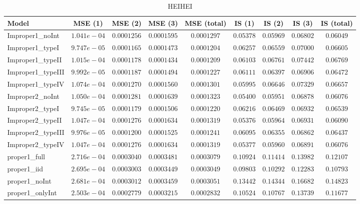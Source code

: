 \begin{table}

\caption{\label{tab:model-choice-sc3}HEIHEI}
\centering
\begin{tabular}{lcccccccc}
\hline
Model  & MSE (1) & MSE (2) & MSE (3) & MSE (total) & IS (1) & IS (2) & IS (3) & \multicolumn{1}{c}{IS (total)} \\ 
\hline
Improper1_noInt  & $1.041e-04$ & $0.0001256$ & $0.0001595$ & $0.0001297$ & $0.05378$ & $0.05969$ & $0.06802$ & $0.06049$ \\
Improper1_typeI  & $9.747e-05$ & $0.0001165$ & $0.0001473$ & $0.0001204$ & $0.06257$ & $0.06559$ & $0.07000$ & $0.06605$ \\
Improper1_typeII  & $1.015e-04$ & $0.0001178$ & $0.0001434$ & $0.0001209$ & $0.06103$ & $0.06761$ & $0.07442$ & $0.06769$ \\
Improper1_typeIII  & $9.992e-05$ & $0.0001187$ & $0.0001494$ & $0.0001227$ & $0.06111$ & $0.06397$ & $0.06906$ & $0.06472$ \\
Improper1_typeIV  & $1.074e-04$ & $0.0001270$ & $0.0001560$ & $0.0001301$ & $0.05995$ & $0.06646$ & $0.07329$ & $0.06657$ \\
Improper2_noInt  & $1.050e-04$ & $0.0001281$ & $0.0001639$ & $0.0001323$ & $0.05400$ & $0.05951$ & $0.06878$ & $0.06076$ \\
Improper2_typeI  & $9.745e-05$ & $0.0001179$ & $0.0001506$ & $0.0001220$ & $0.06216$ & $0.06469$ & $0.06932$ & $0.06539$ \\
Improper2_typeII  & $1.047e-04$ & $0.0001276$ & $0.0001634$ & $0.0001319$ & $0.05376$ & $0.05964$ & $0.06931$ & $0.06090$ \\
Improper2_typeIII  & $9.976e-05$ & $0.0001200$ & $0.0001525$ & $0.0001241$ & $0.06095$ & $0.06355$ & $0.06862$ & $0.06437$ \\
Improper2_typeIV  & $1.047e-04$ & $0.0001276$ & $0.0001634$ & $0.0001319$ & $0.05377$ & $0.05960$ & $0.06891$ & $0.06076$ \\
proper1_full  & $2.716e-04$ & $0.0003040$ & $0.0003481$ & $0.0003079$ & $0.10924$ & $0.11414$ & $0.13982$ & $0.12107$ \\
proper1_iid  & $2.695e-04$ & $0.0003003$ & $0.0003449$ & $0.0003049$ & $0.09803$ & $0.10292$ & $0.12283$ & $0.10793$ \\
proper1_noInt  & $2.681e-04$ & $0.0003012$ & $0.0003459$ & $0.0003051$ & $0.13442$ & $0.14344$ & $0.16682$ & $0.14823$ \\
proper1_onlyInt  & $2.503e-04$ & $0.0002779$ & $0.0003215$ & $0.0002832$ & $0.10524$ & $0.10767$ & $0.13739$ & $0.11677$ \\

\end{tabular}
\end{table}
